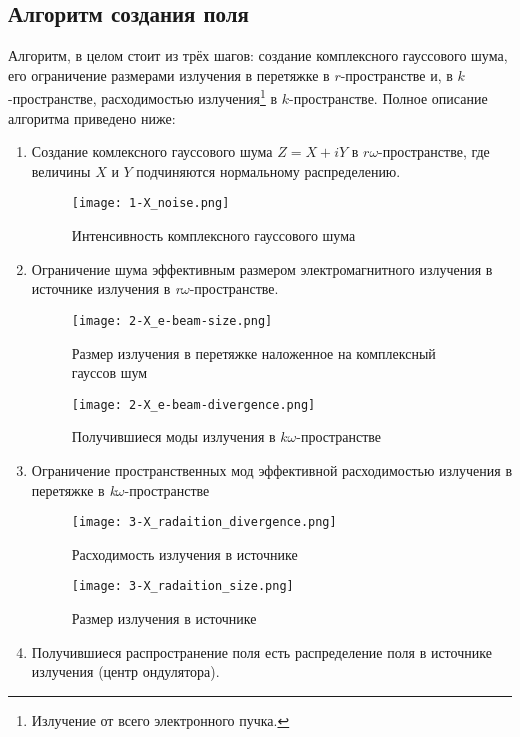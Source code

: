 \subsection{Алгоритм создания поля}
Алгоритм, в целом стоит из трёх шагов: создание комплексного гауссового шума, его ограничение размерами излучения в перетяжке в $r$-пространстве и, в $k$-пространстве, расходимостью излучения\footnote{Излучение от всего электронного пучка.} в $k$-пространстве. Полное описание алгоритма приведено ниже: 
\begin{enumerate}
\item \label{noise} Создание комлексного гауссового шума $Z = X + iY$ в $r\omega$-пространстве, где величины $X$ и $Y$ подчиняются нормальному распределению.
\begin{figure}[H] 
	\centering 	\texttt{[image: 1-X\_noise.png]}
	\caption{Интенсивность комплексного гауссового шума}
	\label{fig:1-noise}
\end{figure}
\item \label{beam_s} Ограничение шума эффективным размером электромагнитного излучения в источнике излучения в \textit{r$\omega$}-пространстве.
\begin{figure}[H]
	\centering
	\begin{minipage}{0.45\textwidth}
		\centering
		\texttt{[image: 2-X\_e-beam-size.png]}
		\caption{Размер излучения в перетяжке наложенное на комплексный гауссов шум}
		\label{fig:2-beam_size_k}
	\end{minipage}
	\begin{minipage}{0.45\textwidth}
		\centering
		\texttt{[image: 2-X\_e-beam-divergence.png]}
		\caption{Получившиеся моды излучения в $k\omega$-пространстве}
		\label{fig:2-beam_size_s}
	\end{minipage}\hfill
\end{figure}
\item \label{beam_k} Ограничение пространственных мод эффективной расходимостью излучения в перетяжке в \textit{k$\omega$}-пространстве
\begin{figure}[H]
	\centering
	\begin{minipage}{0.45\textwidth}
		\centering
		\texttt{[image: 3-X\_radaition\_divergence.png]}
		\caption{Расходимость излучения в источнике}
		\label{fig:3-beam_s}
	\end{minipage}
	\begin{minipage}{0.45\textwidth}
		\centering
		\texttt{[image: 3-X\_radaition\_size.png]}
		\caption{Размер излучения в источнике}
		\label{fig:3-beam_k}
	\end{minipage}
\end{figure}
\item Получившиеся распространение поля есть распределение поля в источнике излучения (центр ондулятора).
\end{enumerate}
